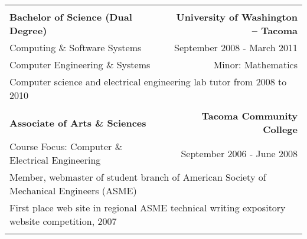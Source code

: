 \documentclass[letterpaper]{article}
\begin{document}
\begin{center}
\begin{tabular}{p{}r}
			\\
			\\
				\textbf{Bachelor of Science (Dual Degree)}			&
				\textbf{University of Washington -- Tacoma}
			\\
				Computing \& Software Systems						&
				September 2008 - March 2011
			\\
				Computer Engineering \& Systems						&
				Minor: Mathematics
			\\
				\multicolumn{2}{p{\textwidth}}{Computer science and electrical engineering lab tutor from 2008 to 2010}	
				
			\\
			\\
				\textbf{Associate of Arts \& Sciences}		    	&
				\textbf{Tacoma Community College}
			\\
				Course Focus: Computer \& Electrical Engineering	&
				September 2006 - June 2008
			\\
				\multicolumn{2}{p{\textwidth}}{Member, webmaster of student branch of American Society of Mechanical Engineers (ASME)}	
			\\
				\multicolumn{2}{p{\textwidth}}{First place web site in regional ASME technical writing expository website competition, 2007}				
			\\
			\\
		\end{tabular}
    \end{center}
    \\
\end{document}
